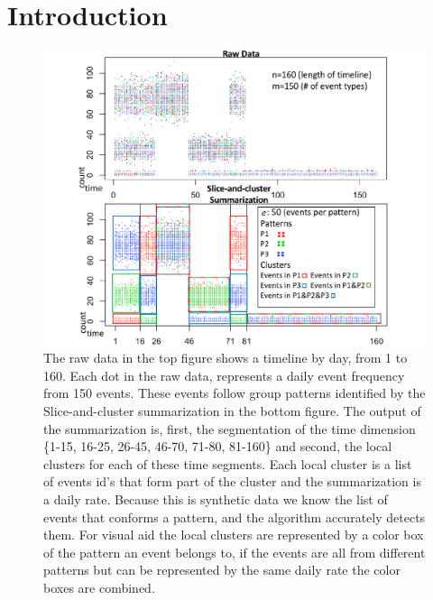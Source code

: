 \section{Introduction}

\begin{figure}[!tbh]  %
  \begin{center}
       \includegraphics[trim = 0.5in 0in 0in 0in, clip,scale=0.35]{images/intro.pdf}
  \end{center}
   \caption{The raw data in the top figure shows a timeline by day, from 1 to 160. Each dot in the raw data, represents a daily event frequency from 150 events. These events follow group patterns identified by the Slice-and-cluster summarization in the bottom figure. The output of the summarization is, first, the segmentation of the time dimension \{1-15, 16-25, 26-45, 46-70, 71-80, 81-160\} and second, the local clusters for each of these time segments. Each local cluster is a list of events id's that form part of the cluster and the summarization is a daily rate. Because this is synthetic data we know the list of events that conforms a pattern, and the algorithm accurately detects them. For visual aid the local clusters are represented by a color box of the pattern an event belongs to, if the events are all from different patterns but can be represented by the same daily rate the color boxes are combined.
}
  \label{fig:intro}
\end{figure}

